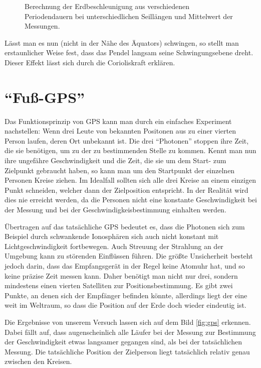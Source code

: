 \documentclass[12pt,a4paper,titlepage,headinclude,bibtotoc]{scrartcl}
\begin{document}
\begin{figure}[!htb]
	\centering
	
	\caption{Berechnung der Erdbeschleunigung aus verschiedenen Periodendauern bei unterschiedlichen Seillängen und Mittelwert der Messungen.}
	\label{fig:gbesch}
\end{figure}

Lässt man es nun (nicht in der Nähe des Äquators) schwingen, so stellt man erstaunlicher Weise fest, dass das Pendel langsam seine Schwingungsebene dreht.
Dieser Effekt lässt sich durch die Corioliskraft erklären.

\section{"`Fuß-GPS"'}
Das Funktionsprinzip von GPS kann man durch ein einfaches Experiment nachstellen:
Wenn drei Leute von bekannten Positonen aus zu einer vierten Person laufen, deren Ort unbekannt ist.
Die drei "`Photonen"' stoppen ihre Zeit, die sie benötigen, um zu der zu bestimmenden Stelle zu kommen.
Kennt man nun ihre ungefähre Geschwindigkeit und die Zeit, die sie um dem Start- zum Zielpunkt gebraucht haben, so kann man um den Startpunkt der einzelnen Personen Kreise ziehen.
Im Idealfall sollten sich alle drei Kreise an einem einzigen Punkt schneiden, welcher dann der Zielposition entspricht.
In der Realität wird dies nie erreicht werden, da die Personen nicht eine konstante Geschwindigkeit bei der Messung und bei der Geschwindigkeisbestimmung einhalten werden.

Übertragen auf das tatsächliche GPS bedeutet es, dass die Photonen sich zum Beispiel durch schwankende Ionosphären sich auch nicht konstant mit Lichtgeschwindigkeit fortbewegen.
Auch Streuung der Strahlung an der Umgebung kann zu störenden Einflüssen führen.
Die größte Unsicherheit besteht jedoch darin, dass das Empfangsgerät in der Regel keine Atomuhr hat, und so keine präzise Zeit messen kann.
Daher benötigt man nicht nur drei, sondern mindestens einen vierten Satelliten zur Positionsbestimmung.
Es gibt zwei Punkte, an denen sich der Empfänger befinden könnte, allerdings liegt der eine weit im Weltraum, so dass die Position auf der Erde doch wieder eindeutig ist.

Die Ergebnisse von unserem Versuch lassen sich auf dem Bild \ref{fig:gps} erkennen.
Dabei fällt auf, dass augenscheinlich alle Läufer bei der Messung zur Bestimmung der Geschwindigkeit etwas langsamer gegangen sind, als bei der tatsächlichen Messung.
Die tatsächliche Position der Zielperson liegt tatsächlich relativ genau zwischen den Kreisen.
\end{document}
